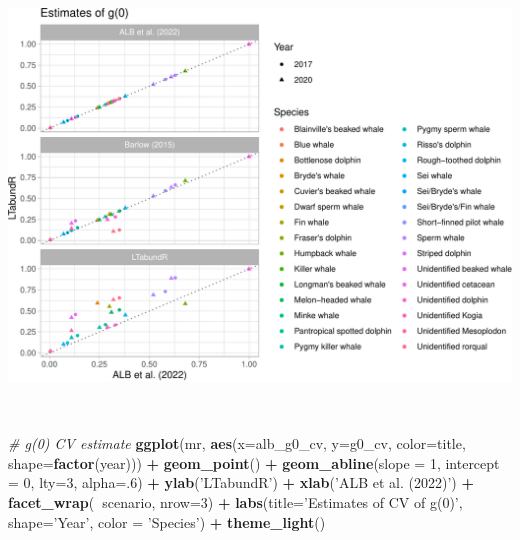 \documentclass[
]{book}
\newenvironment{Shaded}{\begin{snugshade}}{\end{snugshade}}
\newcommand{\CommentTok}[1]{\textcolor[rgb]{0.56,0.35,0.01}{\textit{#1}}}
\newcommand{\DataTypeTok}[1]{\textcolor[rgb]{0.13,0.29,0.53}{#1}}
\newcommand{\DecValTok}[1]{\textcolor[rgb]{0.00,0.00,0.81}{#1}}
\newcommand{\KeywordTok}[1]{\textcolor[rgb]{0.13,0.29,0.53}{\textbf{#1}}}
\newcommand{\NormalTok}[1]{#1}
\newcommand{\OperatorTok}[1]{\textcolor[rgb]{0.81,0.36,0.00}{\textbf{#1}}}
\newcommand{\StringTok}[1]{\textcolor[rgb]{0.31,0.60,0.02}{#1}}
\begin{document}
\includegraphics{figures/unnamed-chunk-386-1.pdf}

~

\begin{Shaded}
\begin{Highlighting}[]
\CommentTok{# g(0) CV estimate}
\KeywordTok{ggplot}\NormalTok{(mr,}
       \KeywordTok{aes}\NormalTok{(}\DataTypeTok{x=}\NormalTok{alb_g0_cv, }\DataTypeTok{y=}\NormalTok{g0_cv, }
           \DataTypeTok{color=}\NormalTok{title, }\DataTypeTok{shape=}\KeywordTok{factor}\NormalTok{(year))) }\OperatorTok{+}
\StringTok{    }\KeywordTok{geom_point}\NormalTok{() }\OperatorTok{+}
\StringTok{    }\KeywordTok{geom_abline}\NormalTok{(}\DataTypeTok{slope =} \DecValTok{1}\NormalTok{, }\DataTypeTok{intercept =} \DecValTok{0}\NormalTok{, }\DataTypeTok{lty=}\DecValTok{3}\NormalTok{, }\DataTypeTok{alpha=}\NormalTok{.}\DecValTok{6}\NormalTok{) }\OperatorTok{+}
\StringTok{    }\KeywordTok{ylab}\NormalTok{(}\StringTok{'LTabundR'}\NormalTok{) }\OperatorTok{+}\StringTok{ }\KeywordTok{xlab}\NormalTok{(}\StringTok{'ALB et al. (2022)'}\NormalTok{) }\OperatorTok{+}
\StringTok{  }\KeywordTok{facet_wrap}\NormalTok{(}\OperatorTok{~}\NormalTok{scenario, }\DataTypeTok{nrow=}\DecValTok{3}\NormalTok{) }\OperatorTok{+}\StringTok{ }
\StringTok{  }\KeywordTok{labs}\NormalTok{(}\DataTypeTok{title=}\StringTok{'Estimates of CV of g(0)'}\NormalTok{, }
       \DataTypeTok{shape=}\StringTok{'Year'}\NormalTok{, }\DataTypeTok{color =} \StringTok{'Species'}\NormalTok{) }\OperatorTok{+}\StringTok{ }
\StringTok{  }\KeywordTok{theme_light}\NormalTok{()}
\end{Highlighting}
\end{Shaded}
\end{document}
